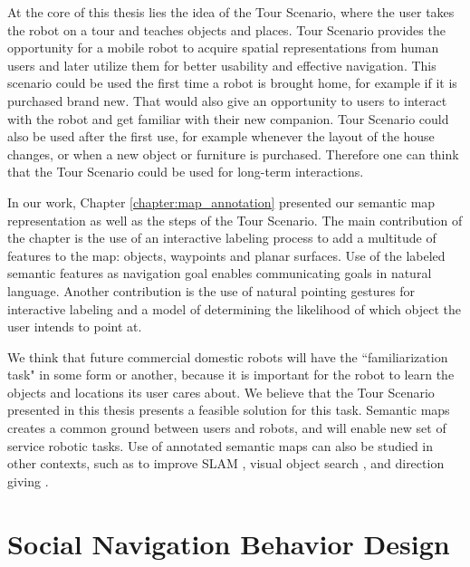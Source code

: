 At the core of this thesis lies the idea of the Tour Scenario, where the user takes the robot on a tour and teaches objects and places. Tour Scenario provides the opportunity for a mobile robot to acquire spatial representations from human users and later utilize them for better usability and effective navigation. This scenario could be used the first time a robot is brought home, for example if it is purchased brand new. That would also give an opportunity to users to interact with the robot and get familiar with their new companion. Tour Scenario could also be used after the first use, for example whenever the layout of the house changes, or when a new object or furniture is purchased. Therefore one can think that the Tour Scenario could be used for long-term interactions.

In our work, Chapter \ref{chapter:map_annotation} presented our semantic map representation as well as the steps of the Tour Scenario. The main contribution of the chapter is the use of an interactive labeling process to add a multitude of features to the map: objects, waypoints and planar surfaces. Use of the labeled semantic features as navigation goal enables communicating goals in natural language. Another contribution is the use of natural pointing gestures for interactive labeling and a model of determining the likelihood of which object the user intends to point at.

We think that future commercial domestic robots will have the ``familiarization task" in some form or another, because it is important for the robot to learn the objects and locations its user cares about. We believe that the Tour Scenario presented in this thesis presents a feasible solution for this task. Semantic maps creates a common ground between users and robots, and will enable new set of service robotic tasks. Use of annotated semantic maps can also be studied in other contexts, such as to improve SLAM \cite{trevor2015semantic}, visual object search \cite{rogers2013life},  and direction giving \cite{kollar2010toward}.






\section{Social Navigation Behavior Design}

